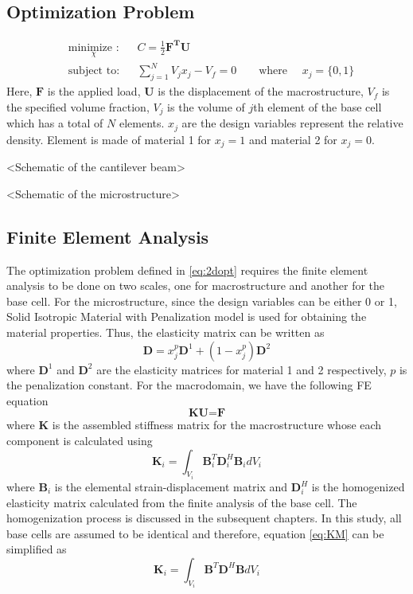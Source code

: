 \documentclass[10pt]{article}
\begin{document}
\subsection{Optimization Problem}
\begin{equation}
\label{eq:2dopt}
\begin{aligned}
& \underset{\chi}{\text{minimize :}}
& &  C = \frac{1}{2}\textbf{F}^\textbf{T}\textbf{U}\\
& \text{subject to:}
& & \sum_{j=1}^N V_j x_j - V_f = 0 \qquad \text{where }\quad x_j = \{0, 1\}
\end{aligned}
\end{equation}
Here, $\textbf{F}$ is the applied load, $\textbf{U}$ is the displacement of the macrostructure, $V_f$ is the specified volume fraction, $V_j$ is the volume of $j$th element of the base cell which has a total of $N$ elements. $x_j$ are the design variables represent the relative density. Element is made of material 1 for $x_j=1$ and material 2 for $x_j=0$. 

<Schematic of the cantilever beam>

<Schematic of the microstructure>

\subsection{Finite Element Analysis} 
The optimization problem defined in \eqref{eq:2dopt} requires the finite element analysis to be done on two scales, one for macrostructure and another for the base cell. For the microstructure, since the design variables can be either 0 or 1, Solid Isotropic Material with Penalization model\cite{paper:simp} is used for obtaining the material properties. Thus, the elasticity matrix can be written as
\begin{equation}
\label{eq:simp}
\textbf{D} = x_j^p\textbf{D}^1 + (1-x_j^p)\textbf{D}^2
\end{equation}
where $\textbf{D}^1$ and $\textbf{D}^2$ are the elasticity matrices for material 1 and 2 respectively, $p$ is the penalization constant.
For the macrodomain, we have the following FE equation
\begin{equation}
\textbf{KU} = \textbf{F}
\end{equation}
where $\textbf{K}$ is the assembled stiffness matrix for the macrostructure whose each component is calculated using
\begin{equation}
\label{eq:KM}
\textbf{K}_i =  \int_{V_i} \textbf{B}_i^T\textbf{D}_i^H\textbf{B}_i dV_i
\end{equation} 
where $\textbf{B}_i$ is the elemental strain-displacement matrix and $\textbf{D}_i^H$ is the homogenized elasticity matrix calculated from the finite analysis of the base cell. The homogenization process\cite{paper:homogenization} is discussed in the subsequent chapters. In this study, all base cells are assumed to be identical and therefore, equation \eqref{eq:KM} can be simplified as
\begin{equation}
\label{eq:KM1}
\textbf{K}_i =  \int_{V_i} \textbf{B}^T\textbf{D}^H\textbf{B} dV_i
\end{equation} 
\end{document}
